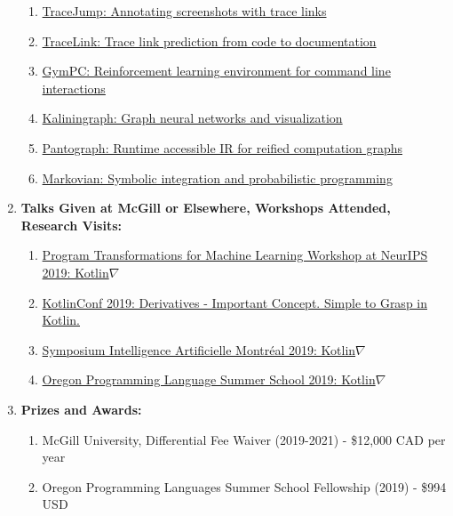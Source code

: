 \documentclass[11pt]{article}
\begin{document}
\begin{enumerate}
        \begin{enumerate}
            \item \href{https://github.com/acejump/tracejump}{TraceJump: Annotating screenshots with trace links}
            \item \href{https://github.com/breandan/tracelink}{TraceLink: Trace link prediction from code to documentation}
            \item \href{https://github.com/breandan/gym-pc}{GymPC: Reinforcement learning environment for command line interactions}
            \item \href{https://github.com/breandan/kaliningraph}{Kaliningraph: Graph neural networks and visualization}
            \item \href{https://github.com/breandan/pantograph}{Pantograph: Runtime accessible IR for reified computation graphs}
            \item \href{https://github.com/breandan/markovian}{Markovian: Symbolic integration and probabilistic programming}
        \end{enumerate}

        \item \textbf{Talks Given at McGill or Elsewhere, Workshops Attended, Research Visits:}

        \begin{enumerate}
            \item \href{https://program-transformations.github.io/}{Program Transformations for Machine Learning Workshop at NeurIPS 2019: Kotlin$\nabla$}
            \item \href{https://kotlinconf.com/2019/talks/}{KotlinConf 2019: Derivatives - Important Concept. Simple to Grasp in Kotlin.}
            \item \href{https://montrealaisymposium.wordpress.com/accepted-papers-2019/}{Symposium Intelligence Artificielle Montr\'eal 2019: Kotlin$\nabla$}
            \item \href{https://www.cs.uoregon.edu/research/summerschool/summer19/topics.php}{Oregon Programming Language Summer School 2019: Kotlin$\nabla$}
        \end{enumerate}

        \item \textbf{Prizes and Awards:}

        \begin{enumerate}
            \item McGill University, Differential Fee Waiver (2019-2021) - \$12,000 CAD per year
            \item Oregon Programming Languages Summer School Fellowship (2019) - \$994 USD
        \end{enumerate}


\end{enumerate}
\end{document}
